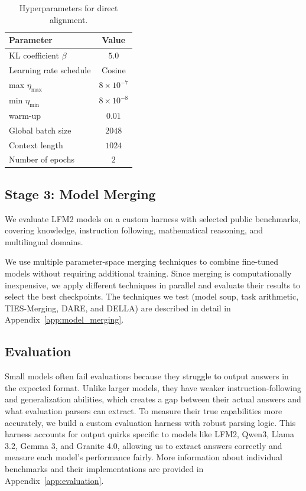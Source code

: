 \documentclass{article}
\begin{document}
\begin{table}[h]
\centering
\begin{tabular}{lc}
\toprule
\textbf{Parameter} & \textbf{Value} \\
\midrule
KL coefficient $\beta$ & $5.0$ \\
Learning rate schedule & Cosine \\
\phantom{Learning rate} max $\eta_{\text{max}}$ & $8\times10^{-7}$ \\
\phantom{Learning rate} min $\eta_{\text{min}}$ & $8\times10^{-8}$ \\
\phantom{Learning rate} warm-up & $0.01$ \\
Global batch size & $2048$ \\
Context length & $1024$ \\
Number of epochs & $2$ \\
\bottomrule
\end{tabular}
\caption{Hyperparameters for direct alignment.}
\label{tab:dpo_params}
\end{table}

\subsection{Stage 3: Model Merging}
\label{subsec:model-merging}

We evaluate LFM2 models on a custom harness with selected public benchmarks, covering knowledge, instruction following, mathematical reasoning, and multilingual domains. 



We use multiple parameter-space merging techniques to combine fine-tuned models without requiring additional training. Since merging is computationally inexpensive, we apply different techniques in parallel and evaluate their results to select the best checkpoints. The techniques we test (model soup, task arithmetic, TIES-Merging, DARE, and DELLA) are described in detail in Appendix~\ref{app:model_merging}.

\subsection{Evaluation}
\label{subsec:posttrain_eval}

Small models often fail evaluations because they struggle to output answers in the expected format. Unlike larger models, they have weaker instruction-following and generalization abilities, which creates a gap between their actual answers and what evaluation parsers can extract. To measure their true capabilities more accurately, we build a custom evaluation harness with robust parsing logic. This harness accounts for output quirks specific to models like LFM2, Qwen3, Llama 3.2, Gemma 3, and Granite 4.0, allowing us to extract answers correctly and measure each model's performance fairly. More information about individual benchmarks and their implementations are provided in Appendix~\ref{app:evaluation}.
\end{document}
